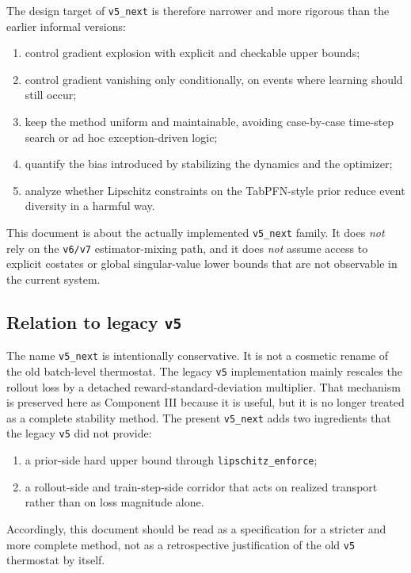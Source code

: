 \documentclass[11pt]{article}
\newcommand{\1}{\mathbf{1}}
\begin{document}
The design target of \texttt{v5\_next} is therefore narrower and more rigorous than the earlier informal versions:
\begin{enumerate}[label=\arabic*.]
  \item control gradient explosion with explicit and checkable upper bounds;
  \item control gradient vanishing only conditionally, on events where learning should still occur;
  \item keep the method uniform and maintainable, avoiding case-by-case time-step search or ad hoc exception-driven logic;
  \item quantify the bias introduced by stabilizing the dynamics and the optimizer;
  \item analyze whether Lipschitz constraints on the TabPFN-style prior reduce event diversity in a harmful way.
\end{enumerate}

This document is about the actually implemented \texttt{v5\_next} family. It does \emph{not} rely on the \texttt{v6/v7} estimator-mixing path, and it does \emph{not} assume access to explicit costates or global singular-value lower bounds that are not observable in the current system.

\subsection{Relation to legacy \texttt{v5}}
The name \texttt{v5\_next} is intentionally conservative. It is not a cosmetic rename of the old batch-level thermostat. The legacy \texttt{v5} implementation mainly rescales the rollout loss by a detached reward-standard-deviation multiplier. That mechanism is preserved here as Component III because it is useful, but it is no longer treated as a complete stability method. The present \texttt{v5\_next} adds two ingredients that the legacy \texttt{v5} did not provide:
\begin{enumerate}[label=\arabic*.]
  \item a prior-side hard upper bound through \texttt{lipschitz\_enforce};
  \item a rollout-side and train-step-side corridor that acts on realized transport rather than on loss magnitude alone.
\end{enumerate}
Accordingly, this document should be read as a specification for a stricter and more complete method, not as a retrospective justification of the old \texttt{v5} thermostat by itself.
\end{document}
